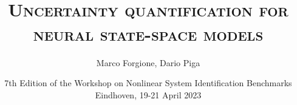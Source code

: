 \usepackage[english]{babel}
\usepackage{amsmath}
\usepackage[latin1]{inputenc}
\usepackage{units}
\usepackage{colortbl}
\usepackage{multimedia}
\usepackage{bm}
\usepackage{subcaption}
\usepackage{algorithm2e}
\usepackage{algorithmic}

{
}
	

\title[Uncertainty quantification]{\textsc{\\
Uncertainty quantification for neural state-space models}}


\author[]{Marco Forgione, Dario Piga}



\date[]{
\footnotesize{
7th Edition of the Workshop on Nonlinear System Identification Benchmarks\\
Eindhoven, 19-21 April 2023
}
}


\subject{System Identification, Deep Learning, Machine Learning, Regularization}


\newcommand{\So}{S_o} %
\newcommand{\hidden}[1]{\overline{#1}}
\newcommand{\nsamp}{N}
\newcommand{\Yid}{Y}
\newcommand{\Uid}{U}
\newcommand{\Did}{{\mathcal{D}}}
\newcommand{\tens}[1]{\bm{#1}}

\newcommand{\batchsize}{q}
\newcommand{\seqlen}{m}
\newcommand{\nin}{n_u} 
\newcommand{\ny}{n_y} 
\newcommand{\nx}{n_x}

\newcommand{\NN}{\mathcal{N}} %

\newcommand{\norm}[1]{\left \lVert #1 \right \rVert}
\DeclareMathOperator*\argmin{arg \, min}
\newcommand{\Name}{\emph{dynoNet}}


\newcommand{\q}{q} %
\newcommand{\A}{A} %
\newcommand{\ac}{a} %
\newcommand{\B}{B} %
\newcommand{\bb}{b} %
\newcommand{\Gmat}{\mathbb{G}} %
\newcommand{\tvec}[1]{\bm{#1}}
\newcommand{\mat}[1]{\bm{#1}}
\newcommand{\sens}[1]{\tilde{#1}}
\newcommand{\adjoint}[1]{\overline{#1}}
\newcommand{\loss}{\mathcal{L}}
\newcommand{\pdiff}[2]{\frac{\partial #1}{\partial #2}}

\newcommand{\conv}{*}
\newcommand{\ccorr}{\star}
